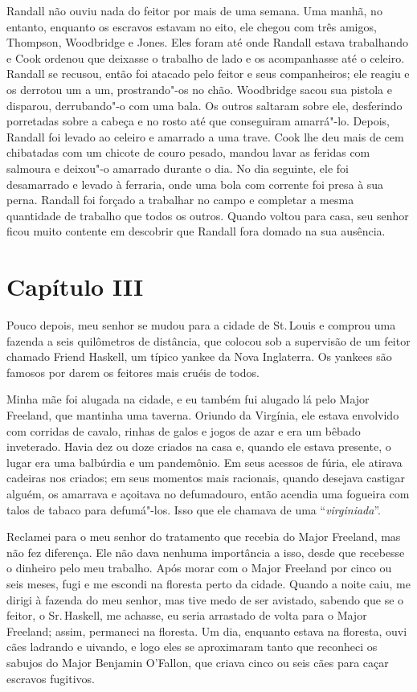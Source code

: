 Randall não ouviu nada do feitor por mais de uma semana. Uma manhã, no
entanto, enquanto os escravos estavam no eito, ele chegou com três
amigos, Thompson, Woodbridge e Jones. Eles foram até onde Randall estava
trabalhando e Cook ordenou que deixasse o trabalho de lado e os
acompanhasse até o celeiro. Randall se recusou, então foi atacado pelo
feitor e seus companheiros; ele reagiu e os derrotou um a um,
prostrando"-os no chão. Woodbridge sacou sua pistola e disparou,
derrubando"-o com uma bala. Os outros saltaram sobre ele, desferindo
porretadas sobre a cabeça e no rosto até que conseguiram amarrá"-lo.
Depois, Randall foi levado ao celeiro e amarrado a uma trave. Cook lhe
deu mais de cem chibatadas com um chicote de couro pesado, mandou lavar
as feridas com salmoura e deixou"-o amarrado durante o dia. No dia
seguinte, ele foi desamarrado e levado à ferraria, onde uma bola com
corrente foi presa à sua perna. Randall foi forçado a trabalhar no campo
e completar a mesma quantidade de trabalho que todos os outros. Quando
voltou para casa, seu senhor ficou muito contente em descobrir que
Randall fora domado na sua ausência.

\chapter*{Capítulo III}

Pouco depois, meu senhor se mudou para a cidade de St.\,Louis e comprou
uma fazenda a seis quilômetros de distância, que colocou sob a
supervisão de um feitor chamado Friend Haskell, um típico yankee da Nova
Inglaterra. Os yankees são famosos por darem os feitores mais cruéis de
todos.

Minha mãe foi alugada na cidade, e eu também fui alugado lá pelo Major
Freeland, que mantinha uma taverna. Oriundo da Virgínia, ele estava
envolvido com corridas de cavalo, rinhas de galos e jogos de azar e era
um bêbado inveterado. Havia dez ou doze criados na casa e, quando ele
estava presente, o lugar era uma balbúrdia e um pandemônio. Em seus
acessos de fúria, ele atirava cadeiras nos criados; em seus momentos
mais racionais, quando desejava castigar alguém, os amarrava e açoitava
no defumadouro, então acendia uma fogueira com talos de tabaco para
defumá"-los. Isso que ele chamava de uma ``\emph{virginiada}''.

Reclamei para o meu senhor do tratamento que recebia do Major Freeland,
mas não fez diferença. Ele não dava nenhuma importância a isso, desde
que recebesse o dinheiro pelo meu trabalho. Após morar com o Major
Freeland por cinco ou seis meses, fugi e me escondi na floresta perto da
cidade. Quando a noite caiu, me dirigi à fazenda do meu senhor, mas tive
medo de ser avistado, sabendo que se o feitor, o Sr.\,Haskell, me
achasse, eu seria arrastado de volta para o Major Freeland; assim,
permaneci na floresta. Um dia, enquanto estava na floresta, ouvi cães
ladrando e uivando, e logo eles se aproximaram tanto que reconheci os
sabujos do Major Benjamin O'Fallon, que criava cinco ou seis cães para
caçar escravos fugitivos.

